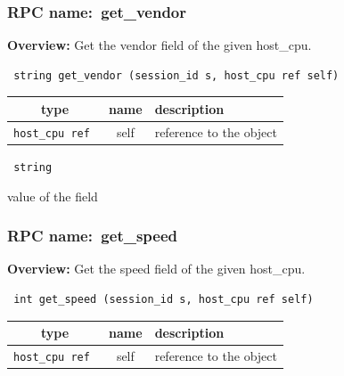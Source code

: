 \subsubsection{RPC name:~get\_vendor}

{\bf Overview:} 
Get the vendor field of the given host\_cpu.

\begin{verbatim} string get_vendor (session_id s, host_cpu ref self)\end{verbatim}



 
\vspace{0.3cm}
\begin{tabular}{|c|c|p{7cm}|}
 \hline
{\bf type} & {\bf name} & {\bf description} \\ \hline
{\tt host\_cpu ref } & self & reference to the object \\ \hline 

\end{tabular}

\vspace{0.3cm}

{\tt 
string
}


value of the field
\vspace{0.3cm}
\vspace{0.3cm}
\vspace{0.3cm}
\subsubsection{RPC name:~get\_speed}

{\bf Overview:} 
Get the speed field of the given host\_cpu.

\begin{verbatim} int get_speed (session_id s, host_cpu ref self)\end{verbatim}



 
\vspace{0.3cm}
\begin{tabular}{|c|c|p{7cm}|}
 \hline
{\bf type} & {\bf name} & {\bf description} \\ \hline
{\tt host\_cpu ref } & self & reference to the object \\ \hline 

\end{tabular}

\vspace{0.3cm}

